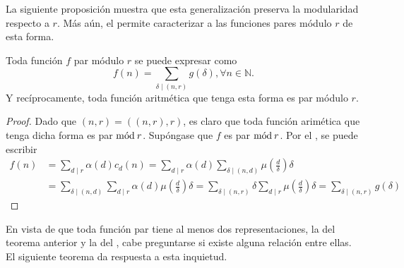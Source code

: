 La siguiente proposición muestra que esta generalización preserva la modularidad respecto a $r$. Más aún, el  permite caracterizar a las funciones pares módulo $r$ de esta forma.

\begin{theorem}
Toda función $f$ par módulo $r$ se puede expresar como
\begin{equation}\label{eq:fou2}
    f(n) = \sum_{\delta \mid (n,r)} g(\delta), \forall n \in \mathbb{N}.
\end{equation}
Y recíprocamente, toda función aritmética que tenga esta forma es par módulo $r$.
\end{theorem}
\begin{proof}
Dado que $(n,r)=((n,r),r)$, es claro que toda función arimética que tenga dicha forma es par $\mathrm{m\acute{o}d\:}r$. Supóngase que $f$ es par $\mathrm{m\acute{o}d\:}r$. Por el , se puede escribir
\begin{align*}
    f(n) & = \sum_{d \mid r} \alpha(d) c_d(n) = \sum_{d \mid r} \alpha(d) \sum_{\delta \mid (n,d)} \mu \left( \frac{d}{\delta} \right) \delta \\
         & = \sum_{\delta \mid (n,d)} \sum_{d \mid r} \alpha(d) \mu \left( \frac{d}{\delta} \right) \delta = \sum_{\delta \mid (n,r)} \delta \sum_{d \mid r} \mu \left( \frac{d}{\delta} \right) \delta = \sum_{\delta \mid (n,r)} g(\delta) 
\end{align*}
\end{proof}

En vista de que toda función par tiene al menos dos representaciones, la del teorema anterior y la del , cabe preguntarse si existe alguna relación entre ellas. El siguiente teorema da respuesta a esta inquietud.

